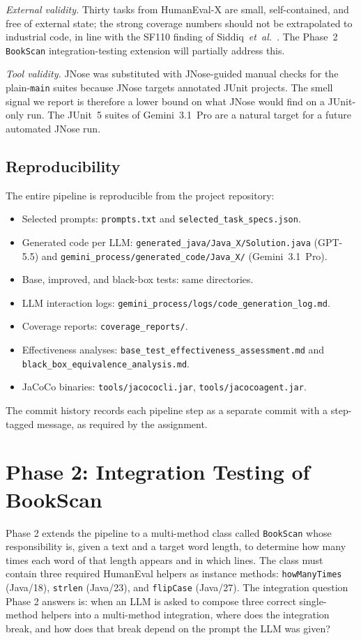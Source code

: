 \documentclass[journal]{IEEEtran}
\begin{document}
\emph{External validity.} Thirty tasks from HumanEval-X are
small, self-contained, and free of external state; the strong
coverage numbers should not be extrapolated to industrial
code, in line with the SF110 finding of
Siddiq~\emph{et~al.}~\cite{siddiq2024junit}. The Phase~2
\texttt{BookScan} integration-testing extension will
partially address this.

\emph{Tool validity.} JNose was substituted with JNose-guided
manual checks for the plain-\texttt{main} suites because
JNose targets annotated JUnit projects. The smell signal we
report is therefore a lower bound on what JNose would find on
a JUnit-only run. The JUnit~5 suites of Gemini~3.1~Pro are a natural
target for a future automated JNose run.

\subsection{Reproducibility}
The entire pipeline is reproducible from the project
repository:
\begin{itemize}
    \item Selected prompts: \texttt{prompts.txt} and
    \texttt{selected\_task\_specs.json}.
    \item Generated code per LLM:
    \texttt{generated\_java/Java\_X/Solution.java} (GPT-5.5)
    and \texttt{gemini\_process/generated\_code/Java\_X/}
    (Gemini~3.1~Pro).
    \item Base, improved, and black-box tests: same
    directories.
    \item LLM interaction logs:
    \texttt{gemini\_process/logs/code\_generation\_log.md}.
    \item Coverage reports: \texttt{coverage\_reports/}.
    \item Effectiveness analyses:
    \texttt{base\_test\_effectiveness\_assessment.md} and
    \texttt{black\_box\_equivalence\_analysis.md}.
    \item JaCoCo binaries: \texttt{tools/jacococli.jar},
    \texttt{tools/jacocoagent.jar}.
\end{itemize}
The commit history records each pipeline step as a separate
commit with a step-tagged message, as required by the
assignment.

\section{Phase 2: Integration Testing of BookScan}
\label{sec:phase2}

Phase 2 extends the pipeline to a multi-method class called
\texttt{BookScan} whose responsibility is, given a text and a
target word length, to determine how many times each word of
that length appears and in which lines. The class must contain
three required HumanEval helpers as instance methods:
\texttt{howManyTimes} (Java/18), \texttt{strlen} (Java/23), and
\texttt{flipCase} (Java/27). The integration question Phase 2
answers is: when an LLM is asked to compose three correct
single-method helpers into a multi-method integration, where
does the integration break, and how does that break depend on
the prompt the LLM was given?
\end{document}
